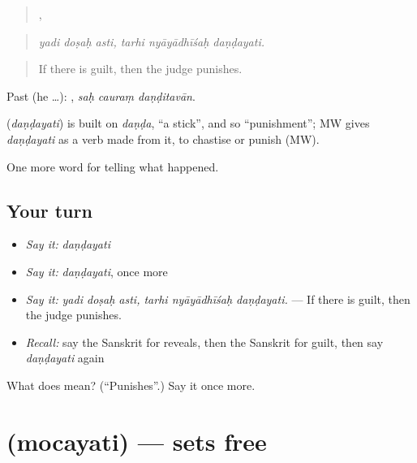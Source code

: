 \begin{quote}
  ,   
\end{quote}

\begin{quote}
\emph{yadi doṣaḥ asti, tarhi nyāyādhīśaḥ daṇḍayati.}
\end{quote}

\begin{quote}
If there is guilt, then the judge punishes.
\end{quote}

Past (he …):   , \emph{saḥ cauraṃ daṇḍitavān}.

\begin{cousinweb}
\textbf{} (\emph{daṇḍayati}) is built on \emph{daṇḍa}, \textquotedblleft{}a stick\textquotedblright{}, and so \textquotedblleft{}punishment\textquotedblright{}; MW gives \emph{daṇḍayati} as a verb made from it, to chastise or punish (MW).
\end{cousinweb}

\begin{grammarlens}[title={What you've built}]
One more word for telling what happened.
\end{grammarlens}

\subsection*{Your turn}
\begin{itemize}
\raggedright
  \item \emph{Say it:} \emph{daṇḍayati}
  \item \emph{Say it:} \emph{daṇḍayati}, once more
  \item \emph{Say it:} \emph{yadi doṣaḥ asti, tarhi nyāyādhīśaḥ daṇḍayati.} — If there is guilt, then the judge punishes.
  \item \emph{Recall:} say the Sanskrit for reveals, then the Sanskrit for guilt, then say \emph{daṇḍayati} again
\end{itemize}

\begin{tcolorbox}[breakable,colback=teal!4,colframe=teal!35!black,title={Before you move on}]
What does  mean? (\textquotedblleft{}Punishes\textquotedblright{}.) Say it once more.
\end{tcolorbox}
\section[\texorpdfstring{\sk{मोचयति} (mocayati)}{मोचयति (mocayati)}]{ (mocayati) — sets free}

